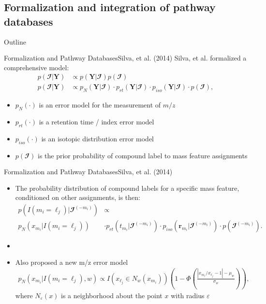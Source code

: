 \documentclass[xcolor=dvipsnames]{beamer}
\begin{document}
\subsection{Formalization and integration of pathway databases}
\begin{frame}{Outline}
	\vspace{-10.5pt}
	\tableofcontents[currentsection,subsectionstyle=show/shaded/hide]
\end{frame}

\begin{frame}{Formalization and Pathway Databases}{Silva, et al. (2014)}
	\vspace{-12pt}
Silva, et al. formalized a comprehensive model:
			\begin{align*}
			p( \mathbfcal{I}|\textbf{Y}) & \propto p(\textbf{Y}| \mathbfcal{I}) p( \mathbfcal{I}) \\
			p(\mathbfcal{I}|\textbf{Y}) & \propto p_N(\textbf{Y}|\mathbfcal{I}) \cdot p_{rt}(\textbf{Y}|\mathbfcal{I}) \cdot p_{iso}(\textbf{Y}|\mathbfcal{I}) \cdot p( \mathbfcal{I}),
			\end{align*} 
			\begin{itemize}
				\item $p_N(\cdot)$ is an error model for the measurement of $m/z$
				\item $p_{rt}(\cdot)$ is a retention time / index error model
				\item $p_{iso}(\cdot)$ is an isotopic distribution error model
				\item $p( \mathbfcal{I})$ is the prior probability of compound label to mass feature assignments
			\end{itemize}
\end{frame}

\begin{frame}{Formalization and Pathway Databases}{Silva, et al. (2014)}
	\vspace{-12pt}
	\begin{itemize}
		\item The probability distribution of compound labels for a specific mass feature, conditioned on other assignments, is then:
		\begin{align*}
		p( I(m_i=\ell_j )| \mathbfcal{I}^{(-m_i)}) &\propto \\ p_N(x_{m_i}| I(m_i=\ell_j )) &\cdot p_{rt}(t_{m_i}|\mathbfcal{I}^{(-m_i)}) \cdot p_{iso}(\textbf{r}_{m_i}|\mathbfcal{I}^{(-m_i)}) \cdot p( \mathbfcal{I}^{(-m_i)}).
		\end{align*} \pause
		\item[]
		\item Also proposed a new m/z error model
		\begin{align*}
		p_N(x_{m_i}| I(m_i=\ell_j ),w) \propto I(x_{\ell_j}\in N_w(x_{m_i})) \left(1-\Phi\left(\frac{|x_{m_i}/x_{\ell_j}-1|-\mu_w}{\sigma_w}\right) \right),
		\end{align*}
		where $N_\varepsilon(x)$ is a neighborhood about the point $x$ with radius $\varepsilon$
	\end{itemize}
\end{frame}
\end{document}
